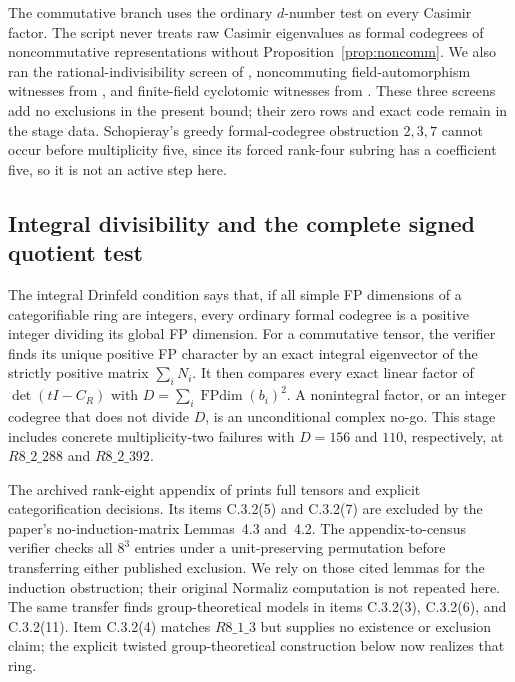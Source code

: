 \documentclass[11pt,reqno]{amsart}
\theoremstyle{definition}
\theoremstyle{remark}
\newcommand{\FPdim}{\operatorname{FPdim}}
\begin{document}
The commutative branch uses the ordinary $d$-number test on every Casimir factor. The script never treats raw Casimir eigenvalues as formal codegrees of noncommutative representations without Proposition~\ref{prop:noncomm}. We also ran the rational-indivisibility screen of \cite[Theorem~4.4]{SchNorm}, noncommuting field-automorphism witnesses from \cite{R6}, and finite-field cyclotomic witnesses from \cite{R4Finite}. These three screens add no exclusions in the present bound; their zero rows and exact code remain in the stage data. Schopieray's greedy formal-codegree obstruction $2,3,7$ \cite{SchGreedy} cannot occur before multiplicity five, since its forced rank-four subring has a coefficient five, so it is not an active step here.

\subsection{Integral divisibility and the complete signed quotient test}
The integral Drinfeld condition \cite[Section~2.3]{Integral} says that, if all simple FP dimensions of a categorifiable ring are integers, every ordinary formal codegree is a positive integer dividing its global FP dimension. For a commutative tensor, the verifier finds its unique positive FP character by an exact integral eigenvector of the strictly positive matrix $\sum_iN_i$. It then compares every exact linear factor of $\det(tI-C_R)$ with $D=\sum_i\FPdim(b_i)^2$. A nonintegral factor, or an integer codegree that does not divide $D$, is an unconditional complex no-go. This stage includes concrete multiplicity-two failures with $D=156$ and $110$, respectively, at $R8\_2\_288$ and $R8\_2\_392$.

The archived rank-eight appendix of \cite{IntegralAppendix} prints full tensors and explicit categorification decisions. Its items C.3.2(5) and C.3.2(7) are excluded by the paper's no-induction-matrix Lemmas~4.3 and~4.2. The appendix-to-census verifier checks all $8^3$ entries under a unit-preserving permutation before transferring either published exclusion. We rely on those cited lemmas for the induction obstruction; their original Normaliz computation is not repeated here. The same transfer finds group-theoretical models in items C.3.2(3), C.3.2(6), and C.3.2(11). Item C.3.2(4) matches $R8\_1\_3$ but supplies no existence or exclusion claim; the explicit twisted group-theoretical construction below now realizes that ring.
\end{document}
